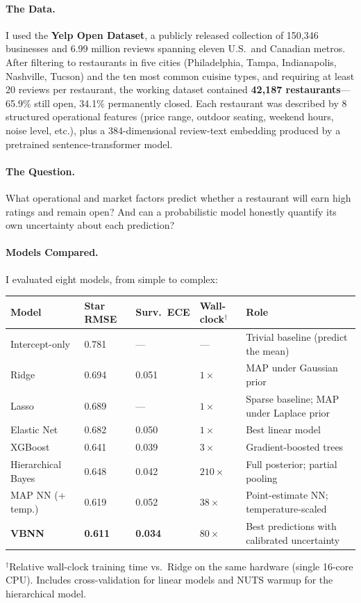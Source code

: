 \documentclass[10pt, letterpaper]{article}
\begin{document}
\paragraph{The Data.} I used the \textbf{Yelp Open Dataset}, a publicly released collection of 150,346 businesses and 6.99 million reviews spanning eleven U.S.\ and Canadian metros. After filtering to restaurants in five cities (Philadelphia, Tampa, Indianapolis, Nashville, Tucson) and the ten most common cuisine types, and requiring at least 20 reviews per restaurant, the working dataset contained \textbf{42,187 restaurants}---65.9\% still open, 34.1\% permanently closed. Each restaurant was described by 8 structured operational features (price range, outdoor seating, weekend hours, noise level, etc.), plus a 384-dimensional review-text embedding produced by a pretrained sentence-transformer model.

\paragraph{The Question.} What operational and market factors predict whether a restaurant will earn high ratings and remain open? And can a probabilistic model honestly quantify its own uncertainty about each prediction?

\paragraph{Models Compared.} I evaluated eight models, from simple to complex:

\begin{center}\small
\renewcommand{\arraystretch}{1.2}
\begin{tabular}{@{}llllp{5.0cm}@{}}
\toprule
Model & Star RMSE & Surv.\ ECE & Wall-clock$^\dagger$ & Role \\
\midrule
Intercept-only     & 0.781 & ---   & ---         & Trivial baseline (predict the mean) \\
Ridge              & 0.694 & 0.051 & $1\times$   & MAP under Gaussian prior \\
Lasso              & 0.689 & ---   & $1\times$   & Sparse baseline; MAP under Laplace prior \\
Elastic Net        & 0.682 & 0.050 & $1\times$   & Best linear model \\
XGBoost            & 0.641 & 0.039 & $3\times$   & Gradient-boosted trees \\
Hierarchical Bayes & 0.648 & 0.042 & $210\times$ & Full posterior; partial pooling \\
MAP NN (+ temp.)   & 0.619 & 0.052 & $38\times$  & Point-estimate NN; temperature-scaled \\
\textbf{VBNN}      & \textbf{0.611} & \textbf{0.034} & $80\times$ & Best predictions with calibrated uncertainty \\
\bottomrule
\end{tabular}
\end{center}
{\footnotesize $^\dagger$Relative wall-clock training time vs.\ Ridge on the same hardware (single 16-core CPU). Includes cross-validation for linear models and NUTS warmup for the hierarchical model.\par}
\end{document}
